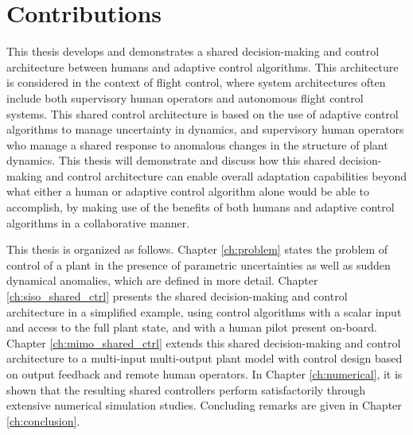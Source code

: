 \section{Contributions}

This thesis develops and demonstrates a shared decision-making and control architecture between humans and adaptive control algorithms. This architecture is considered in the context of flight control, where system architectures often include both supervisory human operators and autonomous flight control systems. This shared control architecture is based on the use of adaptive control algorithms to manage uncertainty in dynamics, and supervisory human operators who manage a shared response to anomalous changes in the structure of plant dynamics. This thesis will demonstrate and discuss how this shared decision-making and control architecture can enable overall adaptation capabilities beyond what either a human or adaptive control algorithm alone would be able to accomplish, by making use of the benefits of both humans and adaptive control algorithms in a collaborative manner. 

This thesis is organized as follows. Chapter \ref{ch:problem} states the problem of control of a plant in the presence of parametric uncertainties as well as sudden dynamical anomalies, which are defined in more detail. Chapter \ref{ch:siso_shared_ctrl} presents the shared decision-making and control architecture in a simplified example, using control algorithms with a scalar input and access to the full plant state, and with a human pilot present on-board. Chapter \ref{ch:mimo_shared_ctrl} extends this shared decision-making and control architecture to a multi-input multi-output plant model with control design based on output feedback and remote human operators. In Chapter \ref{ch:numerical}, it is shown that the resulting shared controllers perform satisfactorily through extensive numerical simulation studies. Concluding remarks are given in Chapter \ref{ch:conclusion}.

